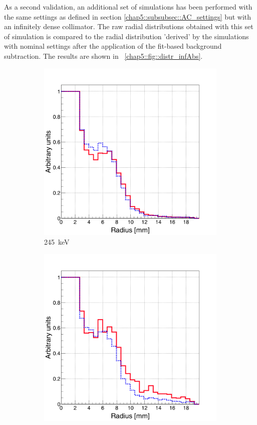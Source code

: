 As a second validation, an additional set of simulations has been performed with the same settings as defined in section \ref{chap5::subsubsec::AC_settings} but with an infinitely dense collimator. The raw radial distributions obtained with this set of simulation is compared to the radial distribution 'derived' by the simulations with nominal settings after the application of the fit-based background subtraction. The results are shown in \figurename~\ref{chap5::fig::distr_infAbs}.

\begin{figure}
\begin{subfigure}{.5\textwidth}
  \centering
  \includegraphics[width=.9\linewidth]{03_GraphicFiles/chapter5_SPECTsimu/SPECT/anger/inf_abs/overlap_infAbs_245keV_normMax}
  \caption{245~keV}
  \label{chap5::fig::rad_distr_infAbs_245keV}
\end{subfigure}
\begin{subfigure}{.5\textwidth}
  \centering
  \includegraphics[width=.9\linewidth]{03_GraphicFiles/chapter5_SPECTsimu/SPECT/anger/inf_abs/overlap_infAbs_555keV_normMax}

\end{subfigure}
\end{figure}
